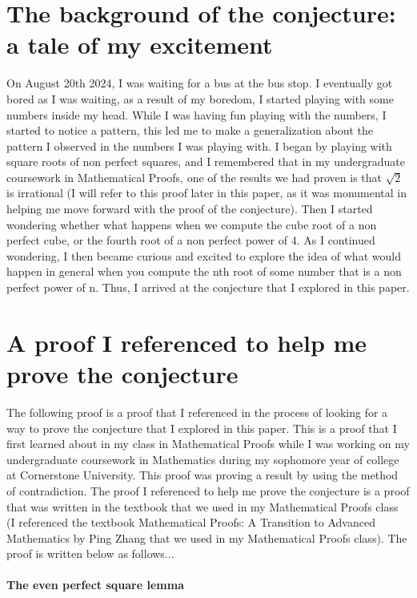 \documentclass{article}
\begin{document}
\section{The background of the conjecture: a tale of my excitement}  
\label{sec:headings}
On August 20th 2024, I was waiting for a bus at the bus stop. I eventually got bored as I was waiting, as a result of my boredom, I started playing with some numbers inside my head. While I was having fun playing with the numbers, I started to notice a pattern, this led me to make a generalization about the pattern I observed in the numbers I was playing with. I began by playing with square roots of non perfect squares, and I remembered that in my undergraduate coursework in Mathematical Proofs, one of the results we had proven is that $\sqrt{2}$ is irrational (I will refer to this proof later in this paper, as it was monumental in helping me move forward with the proof of the conjecture). Then I started wondering whether what happens when we compute the cube root of a non perfect cube, or the fourth root of a non perfect power of 4. As I continued wondering, I then became curious and excited to explore the idea of what would happen in general when you compute the nth root of some number that is a non perfect power of n. Thus, I arrived at the conjecture that I explored in this paper.  

\section{A proof I referenced to help me prove the conjecture} 

The following proof is a proof that I referenced in the process of looking for a way to prove the conjecture that I explored in this paper. This is a proof that I first learned about in my class in Mathematical Proofs while I was working on my undergraduate coursework in Mathematics during my sophomore year of college at Cornerstone University. This proof was proving a result by using the method of contradiction. The proof I referenced to help me prove the conjecture is a proof that was written in the textbook that we used in my Mathematical Proofs class (I referenced the textbook Mathematical Proofs: A Transition to Advanced Mathematics by Ping Zhang that we used in my Mathematical Proofs class). The proof is written below as follows...  

\paragraph{The even perfect square lemma}
\end{document}
